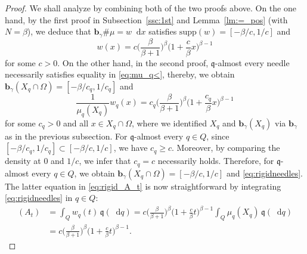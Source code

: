 \documentclass[sts]{imsart}
\theoremstyle{definition}
\theoremstyle{remark}
\newcommand{\bb}{\mathbf{b}}
\newcommand{\fn}{\mathfrak{n}}
\newcommand{\fq}{\mathfrak{q}}
\newcommand{\supp}{\mathrm{supp}}
\newcommand*\diff{\mathop{}\!\mathrm{d}}
\begin{document}
\begin{proof}
We shall analyze by combining both of the two proofs above.
On the one hand, by the first proof in Subsection~\ref{ssc:1st} and Lemma~\ref{lm:=_pos} (with $N=\beta$), we deduce that $\bb_{\gamma}\# \mu=w \diff x$ satisfies $\supp(w)=[-\beta/c,1/c]$ and
\begin{equation*}%
w(x) =c \biggl( \frac{\beta}{\beta +1} \biggr)^\beta \biggl( 1+\frac{c}{\beta}x \biggr)^{\beta -1}
\end{equation*}
for some $c>0$.
On the other hand, in the second proof, $\fq$-almost every needle necessarily satisfies equality in \eqref{eq:mu_q<}, thereby, we obtain $\bb_{\gamma}(X_q \cap \Omega)=[-\beta/c_q,1/c_q]$ and
\[
\frac{1}{\mu_q(X_q)} w_q(x) = c_q \biggl( \frac{\beta}{\beta +1} \biggr)^\beta \biggl( 1+\frac{c_q}{\beta}x \biggr)^{\beta -1}
\]
for some $c_q>0$ and all $x \in X_q \cap \Omega$, where we identified $X_q$ and $\bb_{\gamma}(X_q)$ via $\bb_{\gamma}$ as in the previous subsection.
For $\fq$-almost every $q \in Q$, since $[-\beta/c_q,1/c_q] \subset [-\beta/c,1/c]$, we have $c_q \ge c$.
Moreover, by comparing the density at $0$ and $1/c$, we infer that $c_q=c$ necessarily holds.
Therefore, for $\fq$-almost every $q \in Q$,
we obtain $\bb_{\gamma}(X_q \cap \Omega)=[-\beta/c,1/c]$ and \eqref{eq:rigidneedles}.
The latter equation in \eqref{eq:rigid_A_t} is now straightforward by integrating \eqref{eq:rigidneedles} in $q \in Q$:
\begin{align*}
[\rho\fn](A_t)
&=\int_Q w_q(t) \,\fq(\diff q)
=c\biggl( \frac{\beta}{\beta +1} \biggr)^{\beta}
\biggl( 1+\frac{c}{\beta}t \biggr)^{\beta -1} \int_Q \mu_q(X_q) \,\fq(\diff q) \\
&= c\biggl( \frac{\beta}{\beta +1} \biggr)^{\beta}
\biggl( 1+\frac{c}{\beta}t \biggr)^{\beta -1}.
\end{align*}


\end{proof}
\end{document}
